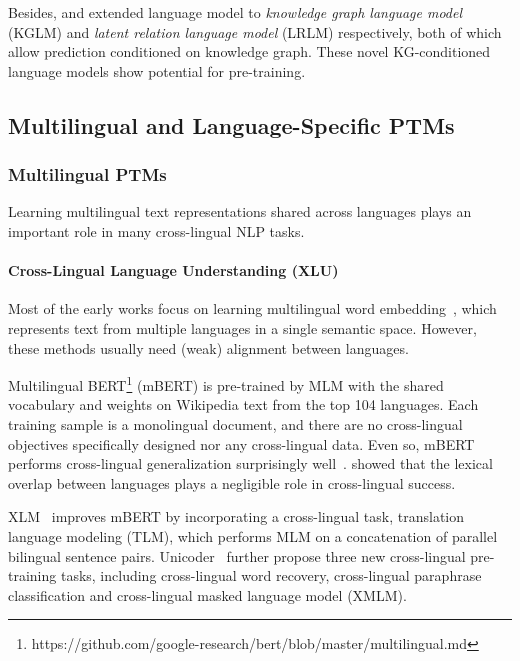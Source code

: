 \documentclass[fleqn]{SCYE-arxiv}
\begin{document}
\begin{multicols}{2}
Besides, \citet{logan2019barack} and \citet{hayashi2019latent} extended language model to \textit{knowledge graph language model} (KGLM) and \textit{latent relation language model} (LRLM) respectively, both of which allow prediction conditioned on knowledge graph. These novel KG-conditioned language models show potential for pre-training.


\subsection{Multilingual and Language-Specific PTMs}
\label{sec:ptms-multilingual}


\subsubsection{Multilingual PTMs}

Learning multilingual text representations shared across languages plays an important role in many cross-lingual NLP tasks.

\paragraph{Cross-Lingual Language Understanding (XLU)}

Most of the early works focus on learning multilingual word embedding~\cite{faruqui2014improving,luong2015bilingual,singla2018multi}, which represents text from multiple languages in a single semantic space. However, these methods usually need (weak) alignment between languages.


Multilingual BERT\footnote{https://github.com/google-research/bert/blob/master/multilingual.md}
(mBERT) is pre-trained by MLM with the shared vocabulary and weights on Wikipedia
text from the top 104 languages. Each training sample is a monolingual document, and there are no cross-lingual objectives specifically designed nor any cross-lingual data. Even so, mBERT
performs cross-lingual generalization surprisingly
well~\cite{DBLP:journals/corr/abs-1906-01502}. \citet{K2020Cross-Lingual} showed that the lexical overlap between languages plays a negligible role in cross-lingual success.

XLM~\cite{DBLP:conf/nips/ConneauL19} improves mBERT by incorporating a cross-lingual task, translation language modeling (TLM), which performs MLM on a concatenation of parallel bilingual sentence pairs.
Unicoder~\cite{huang2019unicoder} further
propose three new cross-lingual pre-training tasks, including cross-lingual word recovery, cross-lingual paraphrase
classification and cross-lingual masked language
model (XMLM).


\end{multicols}
\end{document}
